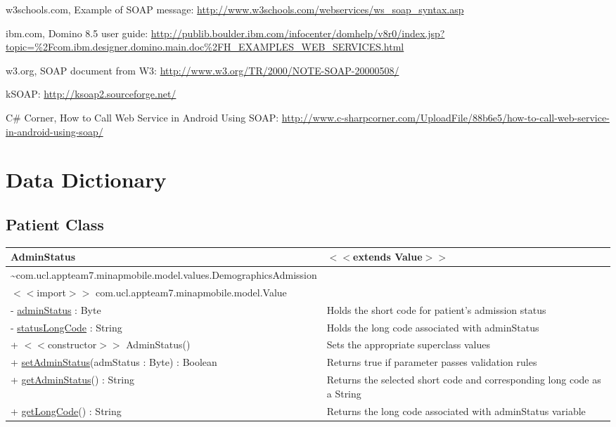\documentclass[12pt,a4paper,oneside,titlepage]{article}
\begin{document}
\newpage
\begin{thebibliography}{9}

w3schools.com, Example of SOAP message: \url{http://www.w3schools.com/webservices/ws_soap_syntax.asp}

ibm.com, Domino 8.5 user guide: \url{http://publib.boulder.ibm.com/infocenter/domhelp/v8r0/index.jsp?topic=%2Fcom.ibm.designer.domino.main.doc%2FH_EXAMPLES_WEB_SERVICES.html}

w3.org, SOAP document from W3: \url{http://www.w3.org/TR/2000/NOTE-SOAP-20000508/}

kSOAP: \url{http://ksoap2.sourceforge.net/}

C\# Corner, How to Call Web Service in Android Using SOAP: \url{http://www.c-sharpcorner.com/UploadFile/88b6e5/how-to-call-web-service-in-android-using-soap/}

\end{thebibliography}

\newpage
\appendix
{}
\section{Data Dictionary}
\subsection{Patient Class}

\begin{center}
	\begin{tabular}{| p{13cm} | p{5cm} |}
	\hline
	\textbf{AdminStatus} & \textbf{$<<$extends Value$>>$} \\ \hline
	\textasciitilde com.ucl.appteam7.minapmobile.model.values.DemographicsAdmission	 & \\ \hline
	$<<$import$>>$ com.ucl.appteam7.minapmobile.model.Value& \\ \hline \hline
	- \underline{adminStatus} : Byte & Holds the short code for patient's admission status \\ \hline
	- \underline{statusLongCode} : String & Holds the long code associated with adminStatus  \\ \hline \hline
	+ $<<$constructor$>>$ AdminStatus() & Sets the appropriate superclass values \\ \hline	
	+ \underline{setAdminStatus}(admStatus : Byte) : Boolean & Returns true if parameter passes validation rules \\ \hline	
	+ \underline{getAdminStatus}() : String & Returns the selected short code and corresponding long code as a String \\ \hline	
	+ \underline{getLongCode}() : String & Returns the long code associated with adminStatus variable \\ \hline	
	\end{tabular}
\end{center}
\end{document}
